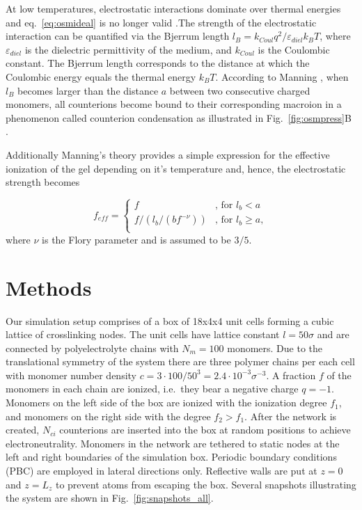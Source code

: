 \documentclass[twoside,twocolumn,9pt]{article}
\begin{document}

At low temperatures, electrostatic interactions dominate over thermal energies and eq.~\eqref{eq:osmideal} is no longer valid \cite{Osada2002}.The strength of the electrostatic interaction can be quantified via the Bjerrum length $l_B = k_{Coul} q^2/\varepsilon_{diel} k_B T$, where $\varepsilon_{diel}$ is the dielectric permittivity of the medium, and $k_{Coul}$ is the Coulombic constant. The Bjerrum length corresponds to the distance at which the Coulombic energy equals the thermal energy $k_BT$. According to Manning \cite{Manning_1977}, when $l_B$ becomes larger than the distance $a$ between two consecutive charged monomers, all counterions become bound to their corresponding macroion in a phenomenon called counterion condensation as illustrated in Fig.~\ref{fig:osmpress}B \cite{Mann2005}.

Additionally Manning's theory provides a simple expression for the effective ionization of the gel depending on it's temperature and, hence, the electrostatic strength \cite{Mann2005} becomes 

\begin{equation}\label{eq:mann_explain}
  f_{eff} =
  \begin{cases}
    f & \text{, for $l_b<a$} \\
    f/(l_b/(b f^{-\nu})) & \text{, for $l_b \geq a$}, \\
  \end{cases}
\end{equation}
where $\nu$ is the Flory parameter and is assumed to be $3/5$.

\section{Methods}
\label{methods}
Our simulation setup comprises of a box of 18x4x4 unit cells forming a cubic lattice of crosslinking nodes. The unit cells have lattice constant $l = 50\sigma$ and are connected by polyelectrolyte chains with $N_m = 100$ monomers. Due to the translational symmetry of the system there are three polymer chains per each cell with monomer number density $c = 3 \cdot 100 / 50^3 = 2.4 \cdot 10^{-3}\sigma^{-3}$. A fraction $f$ of the monomers in each chain are ionized, i.e.~they bear a negative charge $q= -1$.  Monomers on the left side of the box are ionized with the ionization degree $f_1$, and monomers on the right side with the degree $f_2 > f_1$.  After the network is created, $N_{ci}$ counterions are inserted into the box at random positions to achieve electroneutrality. Monomers in the network are tethered to static nodes at the left and right boundaries of the simulation box. Periodic boundary conditions (PBC) are employed in lateral directions only. Reflective walls are put at $z=0$ and $z=L_z$ to prevent atoms from escaping the box. Several snapshots illustrating the system are shown in Fig.~\ref{fig:snapshots_all}.
\end{document}
